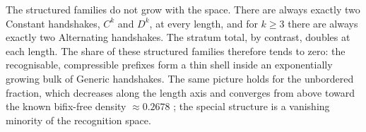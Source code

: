 The structured families do not grow with the space. There are always exactly two
Constant handshakes, $C^k$ and $D^k$, at every length, and for $k\ge 3$ there are always
exactly two Alternating handshakes. The stratum total, by contrast, doubles at each
length. The share of these structured families therefore tends to zero: the recognisable,
compressible prefixes form a thin shell inside an exponentially growing bulk of Generic
handshakes. The same picture holds for the unbordered fraction, which decreases along the
length axis and converges from above toward the known bifix-free density
$\approx 0.2678$ \citep{oeisA003000}; the special structure is a vanishing minority of
the recognition space.
